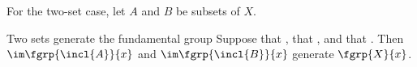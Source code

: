 For the two-set case, let $A$ and $B$ be subsets of $X$.

\begin{corollary}[id=5.2]{Two sets generate the fundamental group}
Suppose that \hypCoverTwo, that \hypPathConnected, and that \hypBasepoint.
Then $\im \fgrp{\incl{A}}{x}$ and $\im \fgrp{\incl{B}}{x}$ generate
$\fgrp{X}{x}$.
\end{corollary}
